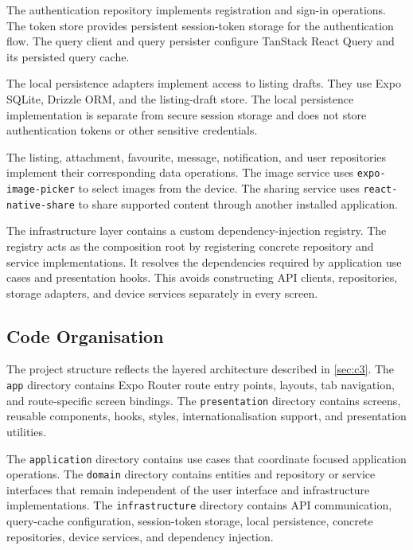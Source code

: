 The authentication repository implements registration and sign-in operations.
The token store provides persistent session-token storage for the authentication flow.
The query client and query persister configure TanStack React Query and its persisted query cache.

The local persistence adapters implement access to listing drafts.
They use Expo SQLite, Drizzle ORM, and the listing-draft store.
The local persistence implementation is separate from secure session storage and does not store authentication tokens or other sensitive credentials.

The listing, attachment, favourite, message, notification, and user repositories implement their corresponding data operations.
The image service uses \texttt{expo-image-picker} to select images from the device.
The sharing service uses \texttt{react-native-share} to share supported content through another installed application.

The infrastructure layer contains a custom dependency-injection registry.
The registry acts as the composition root by registering concrete repository and service implementations.
It resolves the dependencies required by application use cases and presentation hooks.
This avoids constructing API clients, repositories, storage adapters, and device services separately in every screen.

\subsection{Code Organisation}
\label{sec:code-organisation}

The project structure reflects the layered architecture described in \cref{sec:c3}.
The \texttt{app} directory contains Expo Router route entry points, layouts, tab navigation, and route-specific screen bindings.
The \texttt{presentation} directory contains screens, reusable components, hooks, styles, internationalisation support, and presentation utilities.

The \texttt{application} directory contains use cases that coordinate focused application operations.
The \texttt{domain} directory contains entities and repository or service interfaces that remain independent of the user interface and infrastructure implementations.
The \texttt{infrastructure} directory contains API communication, query-cache configuration, session-token storage, local persistence, concrete repositories, device services, and dependency injection.

